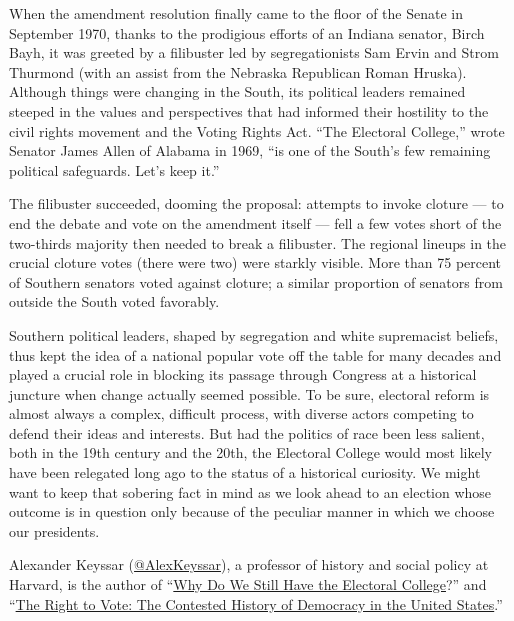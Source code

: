 When the amendment resolution finally came to the floor of the Senate in
September 1970, thanks to the prodigious efforts of an Indiana senator,
Birch Bayh, it was greeted by a filibuster led by segregationists Sam
Ervin and Strom Thurmond (with an assist from the Nebraska Republican
Roman Hruska). Although things were changing in the South, its political
leaders remained steeped in the values and perspectives that had
informed their hostility to the civil rights movement and the Voting
Rights Act. ``The Electoral College,'' wrote Senator James Allen of
Alabama in 1969, ``is one of the South's few remaining political
safeguards. Let's keep it.''

The filibuster succeeded, dooming the proposal: attempts to invoke
cloture --- to end the debate and vote on the amendment itself --- fell
a few votes short of the two-thirds majority then needed to break a
filibuster. The regional lineups in the crucial cloture votes (there
were two) were starkly visible. More than 75 percent of Southern
senators voted against cloture; a similar proportion of senators from
outside the South voted favorably.

Southern political leaders, shaped by segregation and white supremacist
beliefs, thus kept the idea of a national popular vote off the table for
many decades and played a crucial role in blocking its passage through
Congress at a historical juncture when change actually seemed possible.
To be sure, electoral reform is almost always a complex, difficult
process, with diverse actors competing to defend their ideas and
interests. But had the politics of race been less salient, both in the
19th century and the 20th, the Electoral College would most likely have
been relegated long ago to the status of a historical curiosity. We
might want to keep that sobering fact in mind as we look ahead to an
election whose outcome is in question only because of the peculiar
manner in which we choose our presidents.

Alexander Keyssar
(\href{https://twitter.com/alexkeyssar?lang=en}{@AlexKeyssar}), a
professor of history and social policy at Harvard, is the author of
``\href{https://www.hup.harvard.edu/catalog.php?isbn=9780674660151\#:~:text=After\%20tracing\%20the\%20Electoral\%20College's,showing\%20why\%20each\%20has\%20failed.}{Why
Do We Still Have the Electoral College}?'' and
``\href{https://www.basicbooks.com/titles/alexander-keyssar/the-right-to-vote/9780465005024/}{The
Right to Vote: The Contested History of Democracy in the United
States}.''

